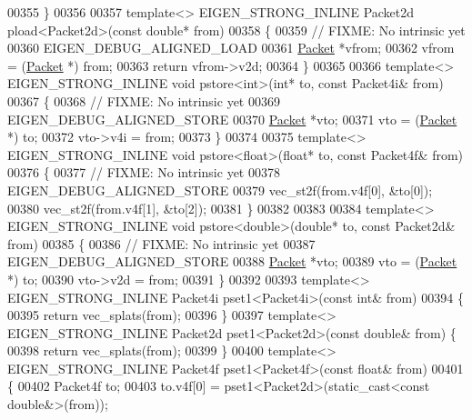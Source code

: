 \begin{DoxyCode}
{00355 \}
00356 
00357 \textcolor{keyword}{template}<> EIGEN\_STRONG\_INLINE Packet2d pload<Packet2d>(\textcolor{keyword}{const} \textcolor{keywordtype}{double}* from)
00358 \{
00359   \textcolor{comment}{// FIXME: No intrinsic yet}
00360   EIGEN\_DEBUG\_ALIGNED\_LOAD
00361   \hyperlink{union_eigen_1_1internal_1_1_packet}{Packet} *vfrom;
00362   vfrom = (\hyperlink{union_eigen_1_1internal_1_1_packet}{Packet} *) from;
00363   \textcolor{keywordflow}{return} vfrom->v2d;
00364 \}
00365 
00366 \textcolor{keyword}{template}<> EIGEN\_STRONG\_INLINE \textcolor{keywordtype}{void} pstore<int>(\textcolor{keywordtype}{int}*       to, \textcolor{keyword}{const} Packet4i& from)
00367 \{
00368   \textcolor{comment}{// FIXME: No intrinsic yet}
00369   EIGEN\_DEBUG\_ALIGNED\_STORE
00370   \hyperlink{union_eigen_1_1internal_1_1_packet}{Packet} *vto;
00371   vto = (\hyperlink{union_eigen_1_1internal_1_1_packet}{Packet} *) to;
00372   vto->v4i = from;
00373 \}
00374 
00375 \textcolor{keyword}{template}<> EIGEN\_STRONG\_INLINE \textcolor{keywordtype}{void} pstore<float>(\textcolor{keywordtype}{float}*   to, \textcolor{keyword}{const} Packet4f& from)
00376 \{
00377   \textcolor{comment}{// FIXME: No intrinsic yet}
00378   EIGEN\_DEBUG\_ALIGNED\_STORE
00379   vec\_st2f(from.v4f[0], &to[0]);
00380   vec\_st2f(from.v4f[1], &to[2]);
00381 \}
00382 
00383 
00384 \textcolor{keyword}{template}<> EIGEN\_STRONG\_INLINE \textcolor{keywordtype}{void} pstore<double>(\textcolor{keywordtype}{double}*   to, \textcolor{keyword}{const} Packet2d& from)
00385 \{
00386   \textcolor{comment}{// FIXME: No intrinsic yet}
00387   EIGEN\_DEBUG\_ALIGNED\_STORE
00388   \hyperlink{union_eigen_1_1internal_1_1_packet}{Packet} *vto;
00389   vto = (\hyperlink{union_eigen_1_1internal_1_1_packet}{Packet} *) to;
00390   vto->v2d = from;
00391 \}
00392 
00393 \textcolor{keyword}{template}<> EIGEN\_STRONG\_INLINE Packet4i pset1<Packet4i>(\textcolor{keyword}{const} \textcolor{keywordtype}{int}&    from)
00394 \{
00395   \textcolor{keywordflow}{return} vec\_splats(from);
00396 \}
00397 \textcolor{keyword}{template}<> EIGEN\_STRONG\_INLINE Packet2d pset1<Packet2d>(\textcolor{keyword}{const} \textcolor{keywordtype}{double}& from) \{
00398   \textcolor{keywordflow}{return} vec\_splats(from);
00399 \}
00400 \textcolor{keyword}{template}<> EIGEN\_STRONG\_INLINE Packet4f pset1<Packet4f>(\textcolor{keyword}{const} \textcolor{keywordtype}{float}&    from)
00401 \{
00402   Packet4f to;
00403   to.v4f[0] = pset1<Packet2d>(\textcolor{keyword}{static\_cast<}\textcolor{keyword}{const }\textcolor{keywordtype}{double}&\textcolor{keyword}{>}(from));
}
\end{DoxyCode}

